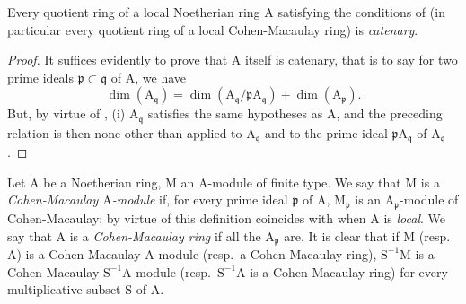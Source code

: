 \begin{corollary}[16.5.12]
\label{0.16.5.12}
Every quotient ring of a local Noetherian ring $\mathrm{A}$ satisfying the conditions of  (in particular every quotient ring of a local Cohen-Macaulay ring) is \emph{catenary}.
\end{corollary}

\begin{proof}
It suffices evidently to prove that $\mathrm{A}$ itself is catenary, that is to say for two prime ideals $\mathfrak{p}\subset\mathfrak{q}$ of $\mathrm{A}$, we have 
\[
  \dim(\mathrm{A}_\mathfrak{q})=\dim(\mathrm{A}_\mathfrak{q}/\mathfrak{p}\mathrm{A}_\mathfrak{q})+\dim(\mathrm{A}_\mathfrak{p}).
\]
But, by virtue of , (i) $\mathrm{A}_\mathfrak{q}$ satisfies the same hypotheses as $\mathrm{A}$, and the preceding relation is then none other than  applied to $\mathrm{A}_\mathfrak{q}$ and to the prime ideal $\mathfrak{p}\mathrm{A}_\mathfrak{q}$ of $\mathrm{A}_\mathfrak{q}$.
\end{proof}


\begin{env}[16.5.13]
\label{0.16.5.13}
Let $\mathrm{A}$ be a Noetherian ring, $\mathrm{M}$ an $\mathrm{A}$-module of finite type.
We say that $\mathrm{M}$ is a \emph{Cohen-Macaulay $\mathrm{A}$-module} if, for every prime ideal $\mathfrak{p}$ of $\mathrm{A}$, $\mathrm{M}_\mathfrak{p}$ is an $\mathrm{A}_\mathfrak{p}$-module of Cohen-Macaulay; by virtue of  this definition coincides with  when $\mathrm{A}$ is \emph{local}.
We say that $\mathrm{A}$ is a \emph{Cohen-Macaulay ring} if all the $\mathrm{A}_\mathfrak{p}$ are.
It is clear that if $\mathrm{M}$ (resp.~$\mathrm{A}$) is a Cohen-Macaulay $\mathrm{A}$-module (resp.~a Cohen-Macaulay ring), $\mathrm{S}^{-1}\mathrm{M}$ is a Cohen-Macaulay $\mathrm{S}^{-1}\mathrm{A}$-module (resp.~$\mathrm{S}^{-1}\mathrm{A}$ is a Cohen-Macaulay ring) for every multiplicative subset $\mathrm{S}$ of $\mathrm{A}$.
\end{env}
